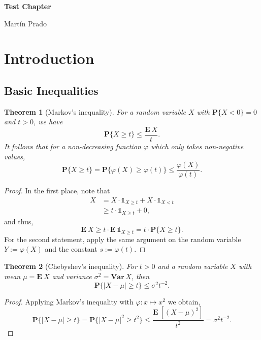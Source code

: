 \documentclass[12pt]{exam}
\def\1{\ensuremath{\mathds{1}}}
\def\E{\ensuremath{\mathbf{E}}\:}
\def\P{\ensuremath{\mathbf{P}}}
\def\Var{\ensuremath{\mathbf{Var}}\,}
\newtheorem{theorem}{Theorem}[section]
\theoremstyle{remark}
\begin{document}
\vspace*{-2em}

\begin{center}
 
  {\Large\sffamily\bfseries Test Chapter}

\end{center}
\begin{center}
Martín Prado 
\end{center}
\vspace{10pt}

\section{Introduction}
\subsection{Basic Inequalities}

\begin{theorem}[Markov's inequality]\label{markov}
  For a random variable $X$ with $\P\{X < 0\} = 0$ and $t>0$, we have
  \[ \P\{X \geq t\} \leq \frac{\E X}{t}.\]
  It follows that for a non-decreasing function $\varphi$ which only takes non-negative values,
  \[ \P\{X \geq t\} = \P\{\varphi(X) \geq \varphi(t)\} \leq \frac{\varphi(X)}{\varphi(t)}.\]
\end{theorem}

\begin{proof}
 In the first place, note that
 \[ \begin{array}{rl}
  X & = X\cdot \1_{X\geq t} + X \cdot \1_{X < t}\\
    & \geq t \cdot \1_{X\geq t} + 0,
 \end{array}\]
and thus,
\[ \E X \geq t \cdot \E \1_{X\geq t} = t \cdot \P\{X \geq t\}. \]
For the second statement, apply the same argument on the random variable $Y := \varphi(X)$ and the constant $s := \varphi(t)$.
\end{proof}

\vspace*{4mm}

\begin{theorem}[Chebyshev's inequality]\label{chebyshev}
  For $t > 0$ and a random variable $X$ with mean $\mu = \E X$ and variance $\sigma^2 = \Var X$, then
  \[ \P\{|X-\mu| \geq t\} \leq \sigma^2 t^{-2}. \] 
\end{theorem}

\begin{proof}
  Applying Markov's inequality with $\varphi: x \mapsto x^2$ we obtain,
  \[ \P\{|X-\mu| \geq t \} = \P\{|X-\mu|^2 \geq t^2 \} \leq \frac{\E [{(X-\mu)}^2]}{t^2} = \sigma^2 t^{-2}.\] 
\end{proof}
 
\end{document}
